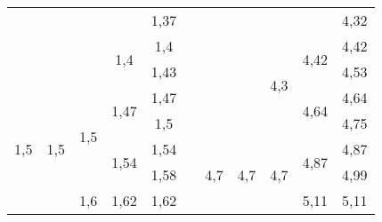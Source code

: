 \begin{table}[H]
\begin{tabular}{|c|c|c|c|c|c|c|c|c|c|c|}
                                    &                      &                      &                       & 1,37               &         &                                    &                       &                      &                       & 4,32               \\ \cline{4-5} \cline{9-11} 
                                    &                      &                      & \multirow{2}{*}{1,4}  & 1,4                &         &                                    &                       & \multirow{4}{*}{4,3} & \multirow{2}{*}{4,42} & 4,42               \\ \cline{5-5} \cline{11-11} 
                                    &                      &                      &                       & 1,43               &         &                                    &                       &                      &                       & 4,53               \\ \cline{1-5} \cline{10-11} 
\multirow{16}{*}{1,5}               & \multirow{8}{*}{1,5} & \multirow{4}{*}{1,5} & \multirow{2}{*}{1,47} & 1,47               &         &                                    &                       &                      & \multirow{2}{*}{4,64} & 4,64               \\ \cline{5-5} \cline{11-11} 
                                    &                      &                      &                       & 1,5                &         &                                    &                       &                      &                       & 4,75               \\ \cline{4-5} \cline{7-11} 
                                    &                      &                      & \multirow{2}{*}{1,54} & 1,54               &         & \multirow{16}{*}{4,7}              & \multirow{8}{*}{4,7}  & \multirow{4}{*}{4,7} & \multirow{2}{*}{4,87} & 4,87               \\ \cline{5-5} \cline{11-11} 
                                    &                      &                      &                       & 1,58               &         &                                    &                       &                      &                       & 4,99               \\ \cline{3-5} \cline{10-11} 
                                    &                      & \multirow{4}{*}{1,6} & \multirow{2}{*}{1,62} & 1,62               &         &                                    &                       &                      & \multirow{2}{*}{5,11} & 5,11               \\ \cline{5-5} \cline{11-11} 

\end{tabular}
\end{table}
